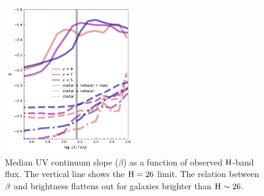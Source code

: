 \begin{figure}
	\centering
	\includegraphics[width=0.5\textwidth]{./figures/beta/beta_summary.pdf}
	\caption{Median UV continuum slope ($\beta$) as a function of observed $\rm H$-band flux. The vertical line shows the $\rm H = 26$ limit. The relation between $\rm \beta$ and brightness flattens out for galaxies brighter than $\rm H \sim 26$. \label{fig:beta_summary}}
\end{figure}


